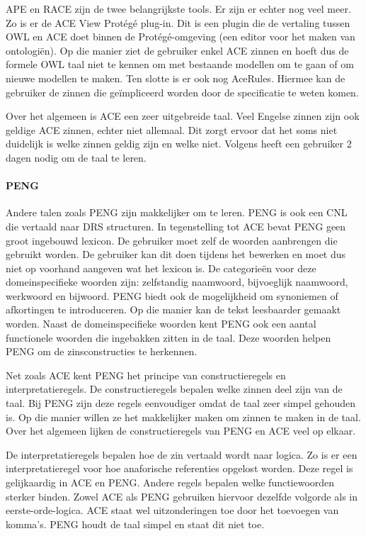 \documentclass[]{article}
\theoremstyle{definition}
\begin{document}
APE en RACE zijn de twee belangrijkste tools. Er zijn er echter nog veel meer. Zo is er de ACE View Protégé plug-in. Dit is een plugin die de vertaling tussen OWL en ACE doet binnen de Protégé-omgeving (een editor voor het maken van ontologiën). Op die manier ziet de gebruiker enkel ACE zinnen en hoeft dus de formele OWL taal niet te kennen om met bestaande modellen om te gaan of om nieuwe modellen te maken. Ten slotte is er ook nog AceRules. Hiermee kan de gebruiker de zinnen die geïmpliceerd worden door de specificatie te weten komen.

Over het algemeen is ACE een zeer uitgebreide taal. Veel Engelse zinnen zijn ook geldige ACE zinnen, echter niet allemaal. Dit zorgt ervoor dat het soms niet duidelijk is welke zinnen geldig zijn en welke niet. Volgens \cite{Fuchs2008} heeft een gebruiker 2 dagen nodig om de taal te leren.

\paragraph{PENG} Andere talen zoals PENG\cite{Schwitter2002} zijn makkelijker om te leren. PENG is ook een CNL die vertaald naar DRS structuren. In tegenstelling tot ACE bevat PENG geen groot ingebouwd lexicon. De gebruiker moet zelf de woorden aanbrengen die gebruikt worden. De gebruiker kan dit doen tijdens het bewerken en moet dus niet op voorhand aangeven wat het lexicon is. De categorieën voor deze domeinspecifieke woorden zijn: zelfstandig naamwoord, bijvoeglijk naamwoord, werkwoord en bijwoord. PENG biedt ook de mogelijkheid om synoniemen of afkortingen te introduceren. Op die manier kan de tekst leesbaarder gemaakt worden. Naast de domeinspecifieke woorden kent PENG ook een aantal functionele woorden die ingebakken zitten in de taal. Deze woorden helpen PENG om de zinsconstructies te herkennen.

Net zoals ACE kent PENG het principe van constructieregels en interpretatieregels. De constructieregels bepalen welke zinnen deel zijn van de taal. Bij PENG zijn deze regels eenvoudiger omdat de taal zeer simpel gehouden is. Op die manier willen ze het makkelijker maken om zinnen te maken in de taal. Over het algemeen lijken de constructieregels van PENG en ACE veel op elkaar.

De interpretatieregels bepalen hoe de zin vertaald wordt naar logica. Zo is er een interpretatieregel voor hoe anaforische referenties opgelost worden. Deze regel is gelijkaardig in ACE en PENG. Andere regels bepalen welke functiewoorden sterker binden. Zowel ACE als PENG gebruiken hiervoor dezelfde volgorde als in eerste-orde-logica. ACE staat wel uitzonderingen toe door het toevoegen van komma's. PENG houdt de taal simpel en staat dit niet toe.
\end{document}
